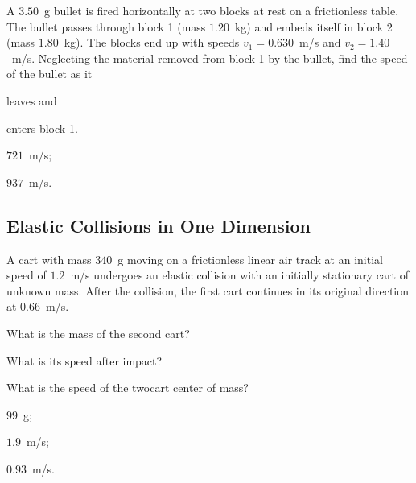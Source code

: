 \begin{problem}
	A $3.50$~g bullet is fired horizontally at two blocks at rest on a frictionless table. The bullet passes through block 1 (mass $1.20$~kg) and embeds itself in block 2 (mass $1.80$~kg). The blocks end up with speeds $v_1 = 0.630$~m/s and $v_2 = 1.40$~m/s. Neglecting the material removed from block 1 by the bullet, find the speed of the bullet as it 
	\begin{enumerate*}[label=(\alph*)]
		\item leaves and
		\item enters block 1.
	\end{enumerate*}
	\begin{solution}
	\begin{enumerate*}[label=(\alph*)]
		\item $721$~m/s; 
		\item $937$~m/s.
	\end{enumerate*}
	\end{solution}
\end{problem}

\subsection{Elastic Collisions in One Dimension}


\begin{problem}
	A cart with mass $340$~g moving on a frictionless linear air track at an initial speed of $1.2$~m/s undergoes an elastic collision with an initially stationary cart of unknown mass. After the collision, the first cart continues in its original direction at $0.66$~m/s.
	\begin{enumerate*}[label=(\alph*)]
		\item What is the mass of the second cart? 
		\item What is its speed after impact?
		\item What is the speed of the twocart center of mass?
	\end{enumerate*}
	\begin{solution}
		\begin{enumerate*}[label=(\alph*)]
			\item $99$~g;
			\item $1.9$~m/s;
			\item $0.93$~m/s.
		\end{enumerate*}
	\end{solution}
\end{problem}

